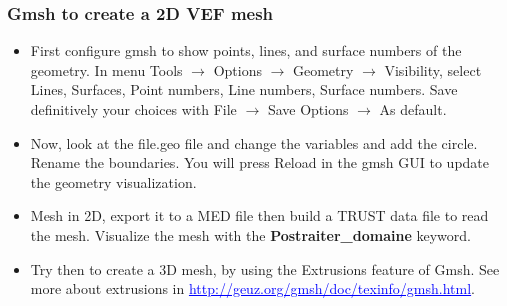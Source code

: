 \documentclass[10pt]{beamer}
\begin{document}
\begin{frame}
\frametitle{Gmsh to create a 2D VEF mesh}
\begin{block}{}

\begin{itemize}
\item First configure gmsh to show points, lines, and surface numbers of the geometry. In menu Tools $\rightarrow$ Options $\rightarrow$ Geometry $\rightarrow$ Visibility, select Lines, Surfaces, Point numbers, Line numbers, Surface numbers. Save definitively your choices with File $\rightarrow$ Save Options $\rightarrow$ As default.

\item Now, look at the file.geo file and change the variables and add the circle. Rename the boundaries. You will press Reload in the gmsh GUI to update the geometry visualization.

\item Mesh in 2D, export it to a MED file then build a TRUST data file to read the mesh. Visualize the mesh with the \textbf{Postraiter\_domaine} keyword.

\item Try then to create a 3D mesh, by using the Extrusions feature of Gmsh. See more about extrusions in \textcolor{blue}{\underline{http://geuz.org/gmsh/doc/texinfo/gmsh.html}}.
\end{itemize}

\end{block}
\end{frame}
\end{document}
